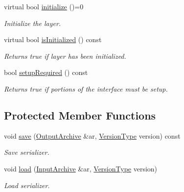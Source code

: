 \begin{DoxyCompactItemize}
virtual bool \hyperlink{classffnn_1_1layer_1_1internal_1_1_interface_a4159d9d163a0bd5287cc02c91b5baba8}{initialize} ()=0
\begin{DoxyCompactList}\small\item\em Initialize the layer. \end{DoxyCompactList}\item 
virtual bool \hyperlink{classffnn_1_1layer_1_1internal_1_1_interface_a67cf9f89a90eadca6f9ec82dd66bd940}{is\-Initialized} () const 
\begin{DoxyCompactList}\small\item\em Returns true if layer has been initialized. \end{DoxyCompactList}\item 
bool \hyperlink{classffnn_1_1layer_1_1internal_1_1_interface_a6e7c83f8328e5c5f49fdba28abfba7c1}{setup\-Required} () const 
\begin{DoxyCompactList}\small\item\em Returns true if portions of the interface must be setup. \end{DoxyCompactList}\end{DoxyCompactItemize}
\subsection*{Protected Member Functions}
\begin{DoxyCompactItemize}
\item 
void \hyperlink{classffnn_1_1layer_1_1internal_1_1_interface_a417d6fda112fdffed8091b0ebd78ed97}{save} (\hyperlink{classffnn_1_1traits_1_1_serializable_a08d986df75d363fa79506d4f6045cb9f}{Output\-Archive} \&ar, \hyperlink{classffnn_1_1traits_1_1_serializable_a08924b3b7d20cb3cb6eafe517d4f7b30}{Version\-Type} version) const 
\begin{DoxyCompactList}\small\item\em Save serializer. \end{DoxyCompactList}\item 
void \hyperlink{classffnn_1_1layer_1_1internal_1_1_interface_a88b5bd86aafd361d3a84dc6cba211195}{load} (\hyperlink{classffnn_1_1traits_1_1_serializable_a6e626759259f8f370dd4303b4441a234}{Input\-Archive} \&ar, \hyperlink{classffnn_1_1traits_1_1_serializable_a08924b3b7d20cb3cb6eafe517d4f7b30}{Version\-Type} version)
\begin{DoxyCompactList}\small\item\em Load serializer. \end{DoxyCompactList}\end{DoxyCompactItemize}
